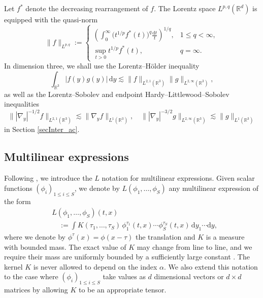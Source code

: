 \documentclass[11pt,letterpaper,reqno]{amsart}
\numberwithin{equation}{section}
\theoremstyle{definition}
\theoremstyle{remark}
\begin{document}
 
 
Let \(f^*\) denote the decreasing rearrangement of \(f\). The Lorentz
space \(L^{p,q}(\mathbb R^d)\) is equipped with the quasi-norm
\[
\|f\|_{L^{p,q}}
:=
\begin{cases}
\displaystyle
\left(
\int_0^\infty
\big(t^{1/p}f^*(t)\big)^q\frac{\mathrm dt}{t}
\right)^{1/q},
& 1\leq q<\infty,\\[1.2ex]
\displaystyle
\sup_{t>0}t^{1/p}f^*(t),
& q=\infty.
\end{cases}
\]
In dimension three, we shall use the Lorentz--Hölder inequality
\[
\int_{\mathbb R^3}|f(y)g(y)|\,\mathrm dy
\lesssim
\|f\|_{L^{2,1}(\mathbb R^3)}
\|g\|_{L^{2,\infty}(\mathbb R^3)},
\]
as well as the Lorentz--Sobolev and endpoint
Hardy--Littlewood--Sobolev inequalities
\[
\big\||\nabla_y|^{-1/2}f\big\|_{L^{2,1}(\mathbb R^3)}
\lesssim
\|\nabla_yf\|_{L^1(\mathbb R^3)},
\quad
\big\||\nabla_y|^{-3/2}g\big\|_{L^{2,\infty}(\mathbb R^3)}
\lesssim
\|g\|_{L^1(\mathbb R^3)}
\]
 in Section \ref{secInter_ac}.


 



\subsection{Multilinear expressions}  \label{sec2.1}
Following \cite{IfT24, TaoCMP02}, we introduce the \(L\) notation for multilinear expressions.  
Given scalar functions $(\phi_i)_{1\le i\le S}$, we denote by $L (\phi_1, \ldots, \phi_S)$ any multilinear expression of the form
$$
\begin{aligned}
& L (\phi_1, \ldots, \phi_S )(t, x) \\
& \quad:=\int K(\tau_1, \ldots, \tau_{S }) \, \phi_1^{\tau_1}(t, x ) \cdots \phi_S^{\tau_S}(t, x ) \, \mathrm{d}y_1 \cdots  \mathrm{d} y ,
\end{aligned}
$$
where we denote by $\phi^\tau(x) = \phi(x-\tau)$ the translation and $K$ is a measure with bounded mass. The exact value of $K$ may change from line to line, and we require their mass are uniformly bounded by a sufficiently large constant . The kernel $K$ is never allowed to depend on the index $\alpha$.  
We also extend this notation to the case where $(\phi_i)_{1\le i\le S}$ take values as $d$ dimensional vectors or $d \times d$ matrices by allowing $K$ to be an appropriate tensor. 
\end{document}

